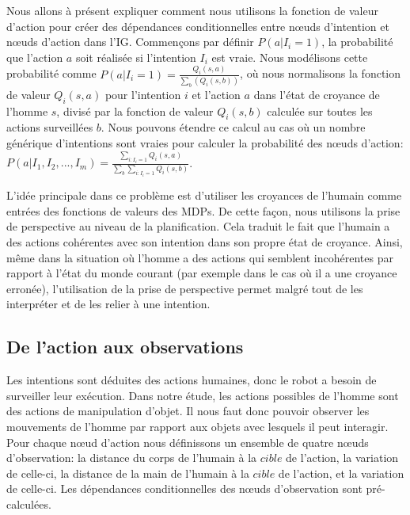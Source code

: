 \documentclass[a4paper,11pt,twoside]{StyleThese}
\begin{document}
Nous allons à présent expliquer comment nous utilisons la fonction de valeur d'action pour créer des dépendances conditionnelles entre nœuds d'intention et nœuds d'action dans l'IG. Commençons par définir \(P(a|I_i=1)\), la probabilité que l'action $a$ soit réalisée si l'intention $I_i$ est vraie. Nous modélisons cette probabilité comme \(P(a|I_i=1)=\frac{Q_i(s,a)}{\sum_b(Q_i(s,b))}\), où nous normalisons la fonction de valeur $Q_i(s,a)$ pour l'intention $i$ et l'action $a$ dans l'état de croyance de l'homme $s$, divisé par la fonction de valeur $Q_i(s,b)$ calculée sur toutes les actions surveillées $b$. Nous pouvons étendre ce calcul au cas où un nombre générique d'intentions sont vraies pour calculer la probabilité des nœuds d'action: \(P(a|I_1,I_2,...,I_m)=\frac{\sum_{i:I_i=1}Q_i(s,a)}{\sum_b\sum_{i:I_i=1}Q_i(s,b)}\).

L'idée principale dans ce problème est d'utiliser les croyances de l'humain comme entrées des fonctions de valeurs des MDPs. De cette façon, nous utilisons la prise de perspective au niveau de la planification. Cela traduit le fait que l'humain a des actions cohérentes avec son intention dans son propre état de croyance. Ainsi, même dans la situation où l'homme a des actions qui semblent incohérentes par rapport à l'état du monde courant (par exemple dans le cas où il a une croyance erronée), l'utilisation de la prise de perspective permet malgré tout de les interpréter et de les relier à une intention.


\subsection{De l'action aux observations}
\label{sec:action}
Les intentions sont déduites des actions humaines, donc le robot a besoin de surveiller leur exécution.
Dans notre étude, les actions possibles de l'homme sont des actions de manipulation d'objet. Il nous faut donc pouvoir observer les mouvements de l'homme par rapport aux objets avec lesquels il peut interagir. Pour chaque nœud d'action nous définissons un ensemble de quatre nœuds d'observation: la distance du corps de l'humain à la $cible$ de l'action, la variation de celle-ci, la distance de la main de l'humain à la $cible$ de l'action, et la variation de celle-ci.
Les dépendances conditionnelles des nœuds d'observation sont pré-calculées.
\end{document}
